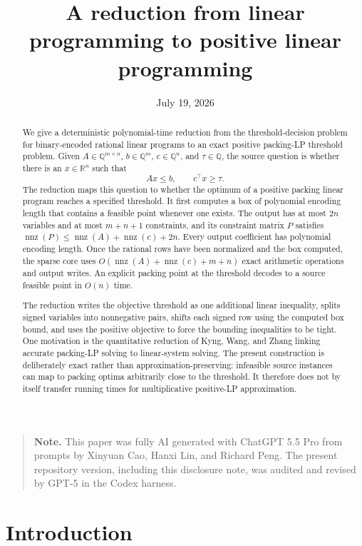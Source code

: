 \documentclass[11pt]{article}
\title{A reduction from linear programming to positive linear programming}
\author{}
\date{July 19, 2026}
\theoremstyle{remark}
\newcommand{\R}{\mathbb{R}}
\newcommand{\nnz}{\operatorname{nnz}}
\begin{document}
\maketitle

\begin{abstract}
We give a deterministic polynomial-time reduction from the
threshold-decision problem for binary-encoded rational linear programs
to an exact positive packing-LP threshold problem.  Given
$A\in\mathbb{Q}^{m\times n}$, $b\in\mathbb{Q}^m$,
$c\in\mathbb{Q}^n$, and $\tau\in\mathbb{Q}$, the source question is
whether there is an $x\in\R^n$ such that
\[
  Ax\leq b,
  \qquad
  c^\top x\geq\tau.
\]
The reduction maps this question to whether the optimum of a positive
packing linear program reaches a specified threshold.  It first
computes a box of polynomial encoding length that contains a feasible
point whenever one exists.  The output has at most $2n$ variables and
at most $m+n+1$ constraints, and its constraint matrix $P$ satisfies
$\nnz(P)\leq\nnz(A)+\nnz(c)+2n$.  Every output coefficient has
polynomial encoding length.  Once the rational rows have been
normalized and the box computed, the sparse core uses
$O(\nnz(A)+\nnz(c)+m+n)$ exact arithmetic operations and output writes.
An explicit packing point at the threshold decodes to a source feasible
point in $O(n)$ time.

The reduction writes the objective threshold as one additional linear
inequality, splits signed variables into nonnegative pairs, shifts each
signed row using the computed box bound, and uses the positive objective
to force the bounding inequalities to be tight.
One motivation is the quantitative reduction of Kyng, Wang, and Zhang
linking accurate packing-LP solving to linear-system solving.  The
present construction is deliberately exact rather than approximation-preserving:
infeasible source instances can map to packing optima arbitrarily close
to the threshold.  It therefore does not by itself transfer running
times for multiplicative positive-LP approximation.
\end{abstract}

\begin{quote}
\small\noindent\textbf{Note.} This paper was fully AI generated with
ChatGPT 5.5 Pro from prompts by Xinyuan Cao, Hanxi Lin, and Richard Peng.
The present repository version, including this disclosure note, was
audited and revised by GPT-5 in the Codex harness.
\end{quote}

\section{Introduction}
\label{sec:introduction}
\end{document}
